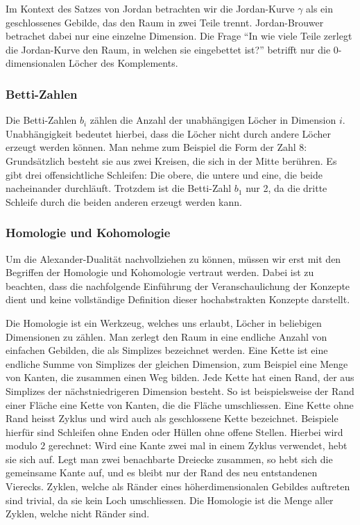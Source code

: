 Im Kontext des Satzes von Jordan betrachten wir die Jordan-Kurve $\gamma$ als ein geschlossenes Gebilde, das den Raum in zwei Teile trennt.
Jordan-Brouwer betrachet dabei nur eine einzelne Dimension.
Die Frage ``In wie viele Teile zerlegt die Jordan-Kurve den Raum, in welchen sie eingebettet ist?'' betrifft nur die 0-dimensionalen Löcher des Komplements.

\subsubsection{Betti-Zahlen}
%

Die Betti-Zahlen $b_i$ zählen die Anzahl der unabhängigen Löcher in Dimension $i$.
Unabhängigkeit bedeutet hierbei, dass die Löcher nicht durch andere Löcher erzeugt werden können.
Man nehme zum Beispiel die Form der Zahl 8: Grundsätzlich besteht sie aus zwei Kreisen, die sich in der Mitte berühren.
Es gibt drei offensichtliche Schleifen: Die obere, die untere und eine, die beide nacheinander durchläuft.
Trotzdem ist die Betti-Zahl $b_1$ nur 2, da die dritte Schleife durch die beiden anderen erzeugt werden kann.

\subsubsection{Homologie und Kohomologie}

Um die Alexander-Dualität nachvollziehen zu können, müssen wir erst mit den Begriffen der Homologie und Kohomologie vertraut werden.
Dabei ist zu beachten, dass die nachfolgende Einführung der Veranschaulichung der Konzepte dient und keine vollständige Definition dieser hochabstrakten Konzepte darstellt.

Die Homologie ist ein Werkzeug, welches uns erlaubt, Löcher in beliebigen Dimensionen zu zählen.
%
Man zerlegt den Raum in eine endliche Anzahl von einfachen Gebilden, die als Simplizes bezeichnet werden.
Eine Kette ist eine endliche Summe von Simplizes der gleichen Dimension, zum Beispiel eine Menge von Kanten, die zusammen einen Weg bilden.
Jede Kette hat einen Rand, der aus Simplizes der nächstniedrigeren Dimension besteht.
So ist beispielsweise der Rand einer Fläche eine Kette von Kanten, die die Fläche umschliessen.
Eine Kette ohne Rand heisst Zyklus und wird auch als geschlossene Kette bezeichnet.
Beispiele hierfür sind Schleifen ohne Enden oder Hüllen ohne offene Stellen.
Hierbei wird modulo $2$ gerechnet: Wird eine Kante zwei mal in einem Zyklus verwendet, hebt sie sich auf.
Legt man zwei benachbarte Dreiecke zusammen, so hebt sich die gemeinsame Kante auf, und es bleibt nur der Rand des neu entstandenen Vierecks.
Zyklen, welche als Ränder eines höherdimensionalen Gebildes auftreten sind trivial, da sie kein Loch umschliessen.
Die Homologie ist die Menge aller Zyklen, welche nicht Ränder sind.


